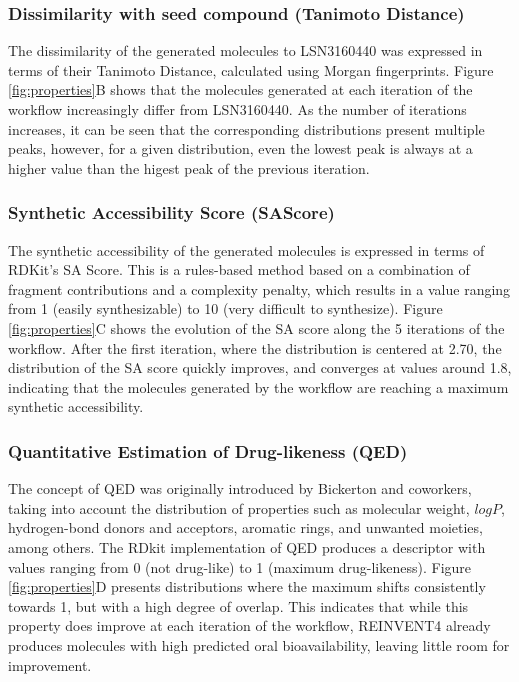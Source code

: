 \documentclass[letterpaper]{article}
\begin{document}
\subsubsection{Dissimilarity with seed compound (Tanimoto Distance)}
The dissimilarity of the generated molecules to LSN3160440 was expressed in terms of their Tanimoto Distance, calculated using Morgan fingerprints\cite{Raymond2002EffectivenessDatabases}. Figure \ref{fig:properties}B shows that the molecules generated at each iteration of the workflow increasingly differ from LSN3160440. As the number of iterations increases, it can be seen that the corresponding distributions present multiple peaks, however, for a given distribution, even the lowest peak is always at a higher value than the higest peak of the previous iteration.

\subsubsection{Synthetic Accessibility Score (SAScore)}
The synthetic accessibility of the generated molecules is expressed in terms of RDKit's SA Score\cite{Ertl2009EstimationContributions}. This is a rules-based method based on a combination of fragment contributions and a complexity penalty, which results in a value ranging from 1 (easily synthesizable) to 10 (very difficult to synthesize). Figure \ref{fig:properties}C shows the evolution of the SA score along the 5 iterations of the workflow. After the first iteration, where the distribution is centered at 2.70, the distribution of the SA score quickly improves, and converges at values around 1.8, indicating that the molecules generated by the workflow are reaching a maximum synthetic accessibility.

\subsubsection{Quantitative Estimation of Drug-likeness (QED)}
The concept of QED was originally introduced by Bickerton and coworkers\cite{Bickerton2012QuantifyingDrugs,Wildman1999PredictionContributions}, taking into account the distribution of properties such as molecular weight, $logP$, hydrogen-bond donors and acceptors, aromatic rings, and unwanted moieties, among others. The RDkit implementation of QED produces a descriptor with values ranging from 0 (not drug-like) to 1 (maximum drug-likeness). Figure \ref{fig:properties}D presents distributions where the maximum shifts consistently towards 1, but with a high degree of overlap. This indicates that while this property does improve at each iteration of the workflow, REINVENT4 already produces molecules with high predicted oral bioavailability, leaving little room for improvement. 
\end{document}
